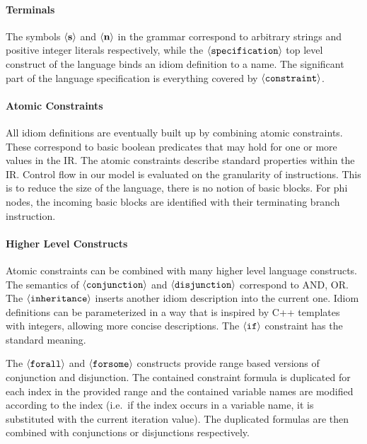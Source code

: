     \paragraph{Terminals}
    The symbols $\left<\text{\bf s}\right>$ and $\left<\text{\bf n}\right>$ in
    the grammar correspond to arbitrary strings and positive integer literals
    respectively, while  the $\left<\text{\tt specification}\right>$ top level
    construct of the language binds an idiom definition to a name.
    The significant  part of the language specification is everything covered by
    $\left<\text{\tt constraint}\right>$.

    \paragraph{Atomic Constraints}
    All idiom definitions are eventually built up by combining atomic
    constraints.
    These correspond to basic boolean predicates that may hold for one or more
    values in the IR.
    The atomic constraints describe standard properties within the IR.
    Control flow in our model is evaluated on the granularity of instructions.
    This is to reduce the size of the language, there is no notion of basic
    blocks.
    For phi nodes, the incoming basic blocks are identified with their
    terminating branch instruction.

    \paragraph{Higher Level Constructs}
    Atomic constraints can be combined with many higher level language
    constructs.
    The semantics of $\left<\text{\tt conjunction}\right>$ and $\left<\text{\tt disjunction}\right>$ correspond to AND, OR.
    The $\left<\text{\tt inheritance}\right>$ inserts another idiom description
    into the current one.
    Idiom definitions can be parameterized in a way that is inspired by C++
    templates with integers, allowing more concise descriptions.
    The $\left<\text{\tt if}\right>$ constraint has the standard meaning.

    The $\left<\text{\tt forall}\right>$ and $\left<\text{\tt forsome}\right>$
    constructs provide range based versions of conjunction and disjunction.
    The contained constraint formula is duplicated for each index in the
    provided range and the contained variable names are modified according to
    the index (i.e.\ if the index occurs in a variable name, it is substituted
    with the current iteration value).
    The duplicated formulas are then combined with conjunctions or disjunctions
    respectively.

